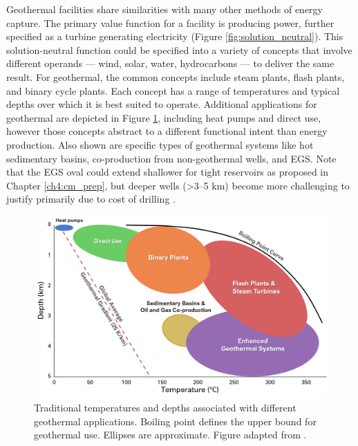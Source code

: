 Geothermal facilities share similarities with many other methods of energy capture. The primary value function for a facility is producing power, further specified as a turbine generating electricity (Figure \ref{fig:solution_neutral}). This solution-neutral function could be specified into a variety of concepts that involve different operands --- wind, solar, water, hydrocarbons --- to deliver the same result. For geothermal, the common concepts include steam plants, flash plants, and binary cycle plants. Each concept has a range of temperatures and typical depths over which it is best suited to operate. Additional applications for geothermal are depicted in Figure \ref{fig:geotherm_apps}, including heat pumps and direct use, however those concepts abstract to a different functional intent than energy production. Also shown are specific types of geothermal systems like hot sedimentary basins, co-production from non-geothermal wells, and EGS. Note that the EGS oval could extend shallower for tight reservoirs as proposed in Chapter \ref{ch4:cm_prep}, but deeper wells (>3--5 km) become more challenging to justify primarily due to cost of drilling \citep{moore_more_2013}.

\begin{figure}
\centering
\includegraphics[width=\textwidth]{templates/images/Figure-Geothermal_Use_Moore2013.png}
\caption[Geothermal applications by temperature and depth]{Traditional temperatures and depths associated with different geothermal applications. Boiling point defines the upper bound for geothermal use. Ellipses are approximate. Figure adapted from \protect\citep{moore_more_2013}.}
\label{fig:geotherm_apps}
\end{figure}


